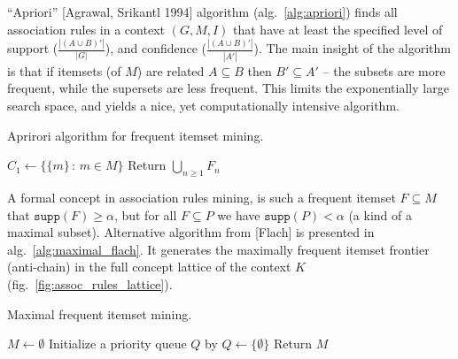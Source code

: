 \documentclass[a4paper]{article}
\begin{document}
\noindent ``Apriori'' [Agrawal, Srikantl 1994] algorithm (alg.~\ref{alg:apriori})
finds all association rules in a context $(G, M, I)$ that have at least the specified
level of support ($\frac{|(A\cup B)'|}{|G|}$), and confidence ($\frac{|(A\cup B)'|}{|A'|}$).
The main insight of the algorithm is that if itemsets (of $M$) are related $A\subseteq B$
then $B'\subseteq A'$ -- the subsets are more frequent, while the supersets are less
frequent. This limits the exponentially large search space, and yields a nice, yet
computationally intensive algorithm.
\begin{algorithm}
    \caption{Aprirori algorithm for frequent itemset mining.}\label{alg:apriori}
    \BlankLine
    $C_1 \leftarrow \{\{m\}\,:\, m\in M\}$\;
    Return $\bigcup_{n\geq1} F_n$\;
\end{algorithm}

A formal concept in association rules mining, is such a frequent itemset $F\subseteq M$
that $\mathtt{supp}(F)\geq \alpha$, but for all $F\subseteq P$ we have $\mathtt{supp}(P)
< \alpha$ (a kind of a maximal subset). Alternative algorithm from [Flach] is presented
in alg.~\ref{alg:maximal_flach}. It generates the maximally frequent itemset frontier
(anti-chain) in the full concept lattice of the context $K$ (fig.~\ref{fig:assoc_rules_lattice}).

\begin{algorithm}
    \caption{Maximal frequent itemset mining.}\label{alg:maximal_flach}
    \BlankLine
    $M \leftarrow \emptyset$\;
    Initialize a priority queue $Q$ by $Q\leftarrow \{\emptyset\}$\;
    Return $M$\;
\end{algorithm}
\end{document}

